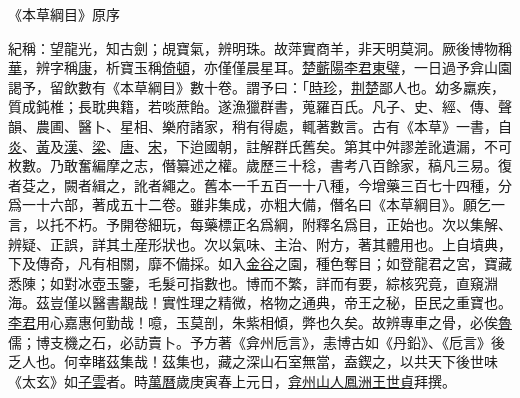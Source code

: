 《本草綱目》原序

紀稱：望龍光，知古劍；覘寶氣，辨明珠。故萍實商羊，非天明莫洞。厥後博物稱\ul{華}，辨字稱\ul{康}，析寶玉稱\ul{倚頓}，亦僅僅晨星耳。\ul{楚}\ul{蘄陽}\ul{李君}\ul{東璧}，一日過予弇山園謁予，留飲數有《本草綱目》數十卷。謂予曰：「\ul{時珍}，\ul{荆楚}鄙人也。幼多羸疾，質成鈍椎；長耽典籍，若啖蔗飴。遂漁獵群書，蒐羅百氏。凡子、史、經、傳、聲韻、農圃、醫卜、星相、樂府諸家，稍有得處，輒著數言。古有《本草》一書，自\ul{炎}、\ul{黃}及\ul{漢}、\ul{梁}、\ul{唐}、\ul{宋}，下迨國朝，註解群氏舊矣。第其中舛謬差訛遺漏，不可枚數。乃敢奮編摩之志，僭纂述之權。歲歷三十稔，書考八百餘家，稿凡三易。復者芟之，闕者緝之，訛者繩之。舊本一千五百一十八種，今增藥三百七十四種，分爲一十六部，著成五十二卷。雖非集成，亦粗大備，僭名曰《本草綱目》。願乞一言，以托不朽。予開卷細玩，每藥標正名爲綱，附釋名爲目，正始也。次以集解、辨疑、正誤，詳其土産形狀也。次以氣味、主治、附方，著其體用也。上自墳典，下及傳奇，凡有相關，靡不備採。如入\ul{金谷}之園，種色奪目；如登龍君之宮，寶藏悉陳；如對冰壺玉鑒，毛髮可指數也。博而不繁，詳而有要，綜核究竟，直窺淵海。茲豈僅以醫書覯哉！實性理之精微，格物之通典，帝王之秘，臣民之重寶也。\ul{李君}用心嘉惠何勤哉！噫，玉莫剖，朱紫相傾，弊也久矣。故辨專車之骨，必俟\ul{魯}儒；博支機之石，必訪賣卜。予方著《弇州卮言》，恚博古如《丹鉛》、《卮言》後乏人也。何幸睹茲集哉！茲集也，藏之深山石室無當，盍鍥之，以共天下後世味《太玄》如\ul{子雲}者。時\ul{萬曆}歲庚寅春上元日，\ul{弇州山人}\ul{鳳洲}\ul{王世貞}拜撰。